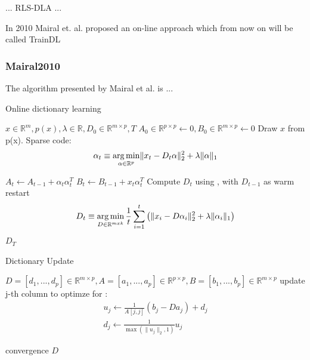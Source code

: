 ... RLS-DLA \cite{Engan2010} ...


In 2010 Mairal et. al. \cite{Mairal2010} proposed an on-line approach which from now on will be called TrainDL

\subsubsection{Mairal2010}
\label{sec:mairal}
The algorithm presented by Mairal et al. \cite{Mairal2010} is ...

\begin{algorithm}
\caption{Online dictionary learning \cite{Mairal2010}}
\begin{algorithmic}[1]
\REQUIRE $x \in \mathbb{R}^m,  p \left( x \right), \lambda \in \mathbb{R}, D_0 \in \mathbb{R}^{m \times p}, T$
\STATE $A_0 \in \mathbb{R}^{p \times p} \gets  0, B_0 \in \mathbb{R}^{m \times p}\gets 0$
\STATE Draw $x$ from p(x).
\STATE Sparse code:
\begin{align*} 
\alpha_t \equiv \operatorname*{arg\,min}_{\alpha\in\mathbb{R}^{p}}  \lVert x_t - D_t\alpha \rVert^{2}_{2}  +  \lambda \lVert \alpha \rVert_{1}
\end{align*}

\STATE $A_t \gets A_{t-1} + \alpha_t\alpha_t^T$
\STATE $B_t \gets B_{t-1} + x_t\alpha_t^T$
\STATE Compute $D_t$ using , with $D_{t-1}$ as warm restart 
\begin{align} 
D_t \equiv \operatorname*{arg\,min}_{D \in \mathbb{R}^{m x k}}  \frac{1}{t} \sum_{i=1}^t \left( \lVert x_i - D\alpha_i \rVert^{2}_{2}  +  \lambda \lVert \alpha_i \rVert_{1} \right) \label{eq:update}
\end{align}
\ENDFOR
\RETURN $D_T$
\end{algorithmic}
\end{algorithm}


\begin{algorithm}
\caption{Dictionary Update}
\label{alg:update}
\begin{algorithmic}[1]
\REQUIRE $D=[d_1,...,d_p] \in \mathbb{R}^{m \times p}, A=[a_1,...,a_p] \in \mathbb{R}^{p \times p}, B=[b_1,...,b_p] \in \mathbb{R}^{m \times p}$
\REPEAT
{}
\STATE update j-th column to optimze for :
\begin{align*}
u_j \gets \frac{1}{A[j,j]}\left(b_j-Da_j\right)+d_j \\
d_j \gets \frac{1}{\max\left(\lVert u_j \rVert_2,1\right)} u_j
\end{align*}

\ENDFOR
\UNTIL convergence 
\RETURN $D$
\end{algorithmic}
\end{algorithm}


